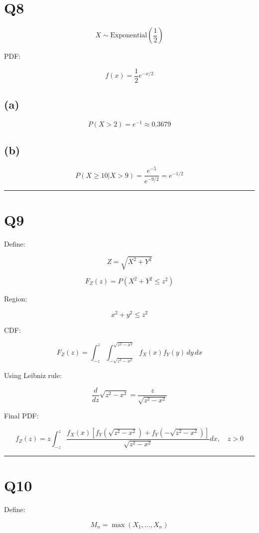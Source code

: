 \documentclass[12pt]{article}
\begin{document}
\section*{Q8}

\[
X \sim \text{Exponential}\left(\frac{1}{2}\right)
\]

PDF:

\[
f(x)=\frac{1}{2}e^{-x/2}
\]

\subsection*{(a)}

\[
P(X>2)=e^{-1}\approx0.3679
\]

\subsection*{(b)}

\[
P(X\ge10|X>9)
=
\frac{e^{-5}}{e^{-9/2}}
=
e^{-1/2}
\]

\hrule
\vspace{0.5cm}

\section*{Q9}

Define:

\[
Z=\sqrt{X^2+Y^2}
\]

\[
F_Z(z)=P(X^2+Y^2\le z^2)
\]

Region:

\[
x^2+y^2\le z^2
\]

CDF:

\[
F_Z(z)
=
\int_{-z}^z
\int_{-\sqrt{z^2-x^2}}^{\sqrt{z^2-x^2}}
f_X(x)f_Y(y)\,dy\,dx
\]

Using Leibniz rule:

\[
\frac{d}{dz}\sqrt{z^2-x^2}
=
\frac{z}{\sqrt{z^2-x^2}}
\]

Final PDF:

\[
f_Z(z)
=
z
\int_{-z}^z
\frac{
f_X(x)
\left[
f_Y(\sqrt{z^2-x^2})
+
f_Y(-\sqrt{z^2-x^2})
\right]
}{
\sqrt{z^2-x^2}
}
dx,
\quad z>0
\]

\hrule
\vspace{0.5cm}

\section*{Q10}

Define:

\[
M_n=\max(X_1,\dots,X_n)
\]
\end{document}

